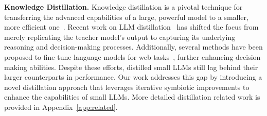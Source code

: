     \noindent\textbf{Knowledge Distillation.} Knowledge distillation is a pivotal technique for transferring the advanced capabilities of a large, powerful model to a smaller, more efficient one~\cite{Gou_2021, xu2024survey}. Recent work on LLM distillation~\cite{hinton2015distilling, anand2023gpt4all, hsieh2023distilling} has shifted the focus from merely replicating the teacher model’s output to capturing its underlying reasoning and decision-making processes. Additionally, several methods have been proposed to fine-tune language models for web tasks~\cite{yin2024agent,hong2024cogagent,lai2024autowebglm}, further enhancing decision-making abilities. Despite these efforts, distilled small LLMs still lag behind their larger counterparts in performance. Our work addresses this gap by introducing a novel distillation approach that leverages iterative symbiotic improvements to enhance the capabilities of small LLMs. More detailed distillation related work is provided in Appendix~\ref{app:related}.
